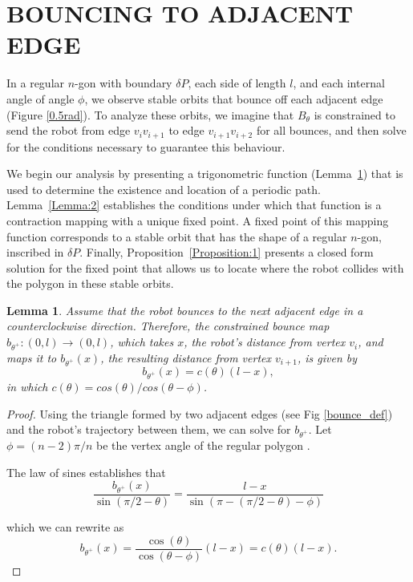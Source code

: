 \documentclass[letterpaper, 10 pt, conference]{ieeeconf}  %
\newtheorem{lemma}{\bf Lemma}
\begin{document}
\section{BOUNCING TO ADJACENT EDGE\label{adj_edge}}
\label{section:BAE}

In a regular $n$-gon with boundary $\delta P$, each side of length $l$, and
each internal angle of angle $\phi$, we observe
stable orbits that bounce off each adjacent edge (Figure
\ref{0.5rad}). 
To analyze these orbits, we imagine that $B_{\theta}$ is
constrained to send the robot from edge $v_i v_{i+1}$ to edge $v_{i+1} v_{i+2}$
for all bounces, and then solve for the conditions necessary to guarantee this
behaviour. 

We begin our analysis by presenting a trigonometric function
(Lemma~\ref{Lemma:1}) that is used to determine the existence and location of a
periodic path. Lemma~\ref{Lemma:2} establishes the conditions under which
that function is a contraction mapping with a unique fixed point. A fixed point
of this mapping function corresponds to a stable orbit that has the shape of a
regular $n$-gon, inscribed in $\delta P$. Finally,
Proposition~\ref{Proposition:1} presents a closed form solution for the fixed
point that allows us to locate where the robot collides with the polygon in
these stable orbits.

\begin{lemma} \label{Lemma:1}
Assume that the robot bounces to the next adjacent edge in a
counterclockwise direction. Therefore, the constrained bounce
map $b_{\theta^+} : (0, l) \to (0, l)$, which takes $x$, the
robot's distance from vertex $v_i$, and maps it to $b_{\theta^+}(x)$,
the resulting distance from vertex $v_{i+1}$, is given by
\begin{equation} \label{b-one-bounce}
b_{\theta^+}(x) = c(\theta)(l-x),
\end{equation}
in which $c(\theta) = cos(\theta) / cos(\theta - \phi)$.
\end{lemma}
\begin{proof}
Using the triangle formed by two adjacent edges (see Fig \ref{bounce_def})
and the robot's trajectory between them, we can solve for
$b_{\theta^+}$. Let $\phi = (n - 2)\pi/n$ be the vertex angle of
the regular polygon \cite{johnson1929}.

The law of sines establishes that
$$ \frac{b_{\theta^+}(x)}{\sin (\pi/2-\theta)} = \frac{l-x}{\sin
(\pi-(\pi/2-\theta)-\phi)} $$

\noindent which we can rewrite as
$$ b_{\theta^+}(x) = \frac{\cos(\theta)}{\cos
(\theta-\phi)}(l-x)  = c(\theta) (l-x). $$

\end{proof}
\end{document}
